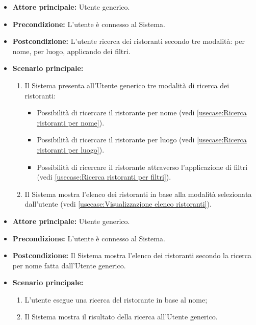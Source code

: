 \label{usecase:Ricerca di ristoranti}
\begin{itemize}
	\item \textbf{Attore principale:} Utente generico.

	\item \textbf{Precondizione:}
	      L'utente è connesso al Sistema.

	\item \textbf{Postcondizione:} L'utente ricerca dei ristoranti secondo tre modalità: per nome, per luogo, applicando dei filtri.

	\item \textbf{Scenario principale:}
	      \begin{enumerate}
		      \item Il Sistema presenta all'Utente generico tre modalità di ricerca dei ristoranti:
		            \begin{itemize}
			            \item Possibilità di ricercare il ristorante per nome (vedi \autoref{usecase:Ricerca ristoranti per nome}).
			            \item Possibilità di ricercare il ristorante per luogo (vedi \autoref{usecase:Ricerca ristoranti per luogo}).
			            \item Possibilità di ricercare il ristorante attraverso l'applicazione di filtri (vedi \autoref{usecase:Ricerca ristoranti per filtri}).
		            \end{itemize}

		      \item Il Sistema mostra l'elenco dei ristoranti in base alla modalità selezionata dall'utente (vedi \autoref{usecase:Visualizzazione elenco ristoranti}).

	      \end{enumerate}
\end{itemize}


\label{usecase:Ricerca ristoranti per nome}
\begin{itemize}
	\item \textbf{Attore principale:} Utente generico.

	\item \textbf{Precondizione:} L'utente è connesso al Sistema.

	\item \textbf{Postcondizione:} Il Sistema mostra l'elenco dei ristoranti secondo la ricerca per nome fatta dall'Utente generico.

	\item \textbf{Scenario principale:}
	      \begin{enumerate}
		      \item L'utente esegue una ricerca del ristorante in base al nome;
		      \item Il Sistema mostra il risultato della ricerca all'Utente generico.
	      \end{enumerate}
\end{itemize}

